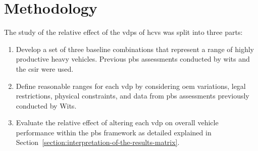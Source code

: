 \chapter{Methodology}\label{chapter:methodology}






The study of the relative effect of the \glspl{vdp} of \glspl{hcv} was split into three parts:

\begin{enumerate}
	\item Develop a set of three baseline combinations that represent a range of highly productive heavy vehicles. Previous \gls{pbs} assessments conducted by \gls{wits} and the \gls{csir} were used.
	\item Define reasonable ranges for each \gls{vdp} by considering \gls{oem} variations, legal restrictions, physical constraints, and data from \gls{pbs} assessments previously conducted by Wits.
	\item Evaluate the relative effect of altering each \gls{vdp} on overall vehicle performance within the \gls{pbs} framework as detailed explained in Section~\ref{section:interpretation-of-the-results-matrix}.
\end{enumerate}

